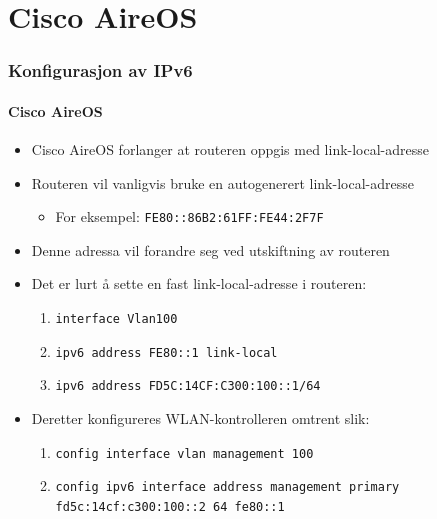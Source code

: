 \section{Cisco AireOS}
\begin{frame}
  \frametitle{Konfigurasjon av IPv6}
  \framesubtitle{Cisco AireOS}
  \begin{itemize}
  \item Cisco AireOS forlanger at routeren oppgis med link-local-adresse
  \item Routeren vil vanligvis bruke en autogenerert link-local-adresse
    \begin{itemize}
    \item For eksempel: \texttt{FE80::86B2:61FF:FE44:2F7F}
    \end{itemize}
  \item Denne adressa vil forandre seg ved utskiftning av routeren
  \item Det er lurt å sette en fast link-local-adresse i routeren:
    \begin{enumerate}
    \item \texttt{interface Vlan100}
    \item \alert{\texttt{ipv6 address FE80::1 link-local}}
    \item \texttt{ipv6 address FD5C:14CF:C300:100::1/64}
    \end{enumerate}
  \item Deretter konfigureres WLAN-kontrolleren omtrent slik:
    \begin{enumerate}
    \item \texttt{\footnotesize config interface vlan management 100}
    \item \texttt{\footnotesize config ipv6 interface address management primary fd5c:14cf:c300:100::2 64 \alert{fe80::1}}
    \end{enumerate}
  \end{itemize}
\end{frame}

